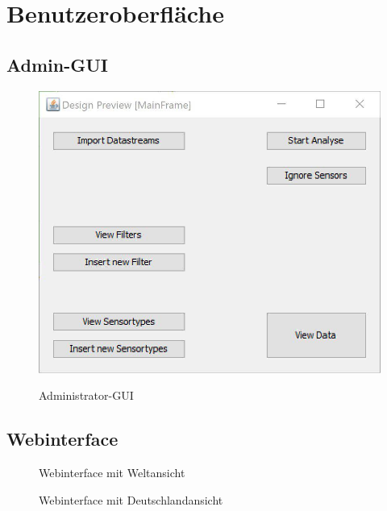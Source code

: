 \chapter{Benutzeroberfläche}
\section{Admin-GUI}
\begin{figure}[H]
	\centering
		\includegraphics[width=0.6\linewidth]{gui/backend/BackGUISketch.jpg}\\
	\caption{Administrator-GUI}
\end{figure}
\newpage
\section{Webinterface}
\begin{figure}[H]
	\centering
	\caption{Webinterface mit Weltansicht}
\end{figure}
\begin{figure}[H]
	\centering
	\caption{Webinterface mit Deutschlandansicht}
\end{figure}